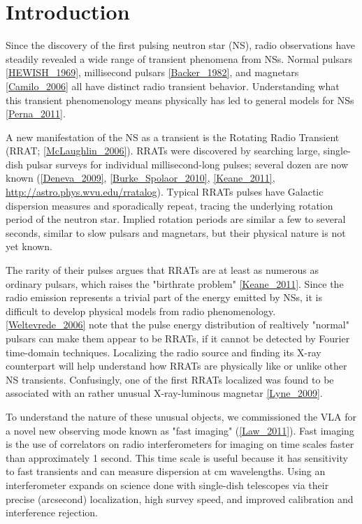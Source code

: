 \section{Introduction}

Since the discovery of the first pulsing neutron star (NS), radio observations have steadily revealed a wide range of transient phenomena from NSs. Normal pulsars \ref{HEWISH_1969}, millisecond pulsars \ref{Backer_1982}, and magnetars \ref{Camilo_2006} all have distinct radio transient behavior. Understanding what this transient phenomenology means physically has led to general models for NSs \ref{Perna_2011}.

A new manifestation of the NS as a transient is the Rotating Radio Transient (RRAT; \ref{McLaughlin_2006}). RRATs were discovered by searching large, single-dish pulsar surveys for individual millisecond-long pulses; several dozen are now known (\ref{Deneva_2009}, \ref{Burke_Spolaor_2010}, \ref{Keane_2011}, \url{http://astro.phys.wvu.edu/rratalog}). Typical RRATs pulses have Galactic dispersion measures and sporadically repeat, tracing the underlying rotation period of the neutron star. Implied rotation periods are similar a few to several seconds, similar to slow pulsars and magnetars, but their physical nature is not yet known. 

The rarity of their pulses argues that RRATs are at least as numerous as ordinary pulsars, which raises the "birthrate problem" \ref{Keane_2011}. Since the radio emission represents a trivial part of the energy emitted by NSs, it is difficult to develop physical models from radio phenomenology. \ref{Weltevrede_2006} note that the pulse energy distribution of realtively "normal" pulsars can make them appear to be RRATs, if it cannot be detected by Fourier time-domain techniques. Localizing the radio source and finding its X-ray counterpart will help understand how RRATs are physically like or unlike other NS transients. Confusingly, one of the first RRATs localized was found to be associated with an rather unusual X-ray-luminous magnetar \ref{Lyne_2009}.

To understand the nature of these unusual objects, we commissioned the VLA for a novel new observing mode known as "fast imaging" (\ref{Law_2011}). Fast imaging is the use of correlators on radio interferometers for imaging on time scales faster than approximately 1 second. This time scale is useful because it has sensitivity to fast transients and can measure dispersion at cm wavelengths. Using an interferometer expands on science done with single-dish telescopes via their precise (arcsecond) localization, high survey speed, and improved calibration and interference rejection.

